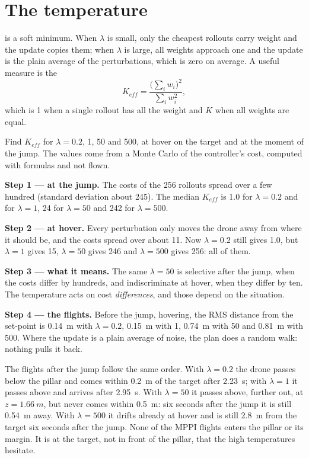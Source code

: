 \section{The temperature}

 is a soft minimum. When $\lambda$ is small, only the cheapest rollouts carry weight and the update copies them; when $\lambda$ is large, all weights approach one and the update is the plain average of the perturbations, which is zero on average. A useful measure is the 
\begin{equation}\label{eq:mppi-keff}
  K_{eff} = \frac{\big(\sum_i w_i\big)^2}{\sum_i w_i^2},
\end{equation}
which is 1 when a single rollout has all the weight and $K$ when all weights are equal.

\begin{example}
\label{ex:mppi-keff}
Find $K_{eff}$ for $\lambda = 0.2$, 1, 50 and 500, at hover on the target and at the moment of the jump. The values come from a Monte Carlo of the controller's cost, computed with formulas and not flown.

\textbf{Step 1 — at the jump.} The costs of the 256 rollouts spread over a few hundred (standard deviation about 245). The median $K_{eff}$ is 1.0 for $\lambda = 0.2$ and for $\lambda = 1$, 24 for $\lambda = 50$ and 242 for $\lambda = 500$.

\textbf{Step 2 — at hover.} Every perturbation only moves the drone away from where it should be, and the costs spread over about 11. Now $\lambda = 0.2$ still gives 1.0, but $\lambda = 1$ gives 15, $\lambda = 50$ gives 246 and $\lambda = 500$ gives 256: all of them.

\textbf{Step 3 — what it means.} The same $\lambda = 50$ is selective after the jump, when the costs differ by hundreds, and indiscriminate at hover, when they differ by ten. The temperature acts on cost \emph{differences}, and those depend on the situation.

\textbf{Step 4 — the flights.} Before the jump, hovering, the RMS distance from the set-point is \SI{0.14}{m} with $\lambda = 0.2$, \SI{0.15}{m} with 1, \SI{0.74}{m} with 50 and \SI{0.81}{m} with 500. Where the update is a plain average of noise, the plan does a random walk: nothing pulls it back.
\end{example}

The flights after the jump follow the same order. With $\lambda = 0.2$ the drone passes below the pillar and comes within \SI{0.2}{m} of the target after \SI{2.23}{s}; with $\lambda = 1$ it passes above and arrives after \SI{2.95}{s}. With $\lambda = 50$ it passes above, further out, at $z = \SI{1.66}{m}$, but never comes within \SI{0.5}{m}: six seconds after the jump it is still \SI{0.54}{m} away. With $\lambda = 500$ it drifts already at hover and is still \SI{2.8}{m} from the target six seconds after the jump. None of the MPPI flights enters the pillar or its margin. It is at the target, not in front of the pillar, that the high temperatures hesitate.

